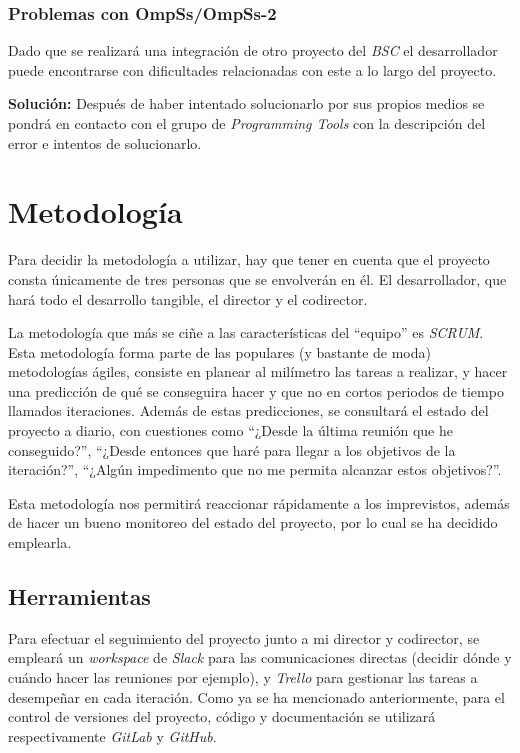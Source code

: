 \subsubsection{Problemas con OmpSs/OmpSs-2}

Dado que se realizará una integración de otro proyecto del \textit{BSC} el desarrollador puede encontrarse con dificultades relacionadas con este a lo largo del proyecto.
\par\medskip

\textbf{Solución:} Después de haber intentado solucionarlo por sus propios medios se pondrá en contacto con el grupo de \textit{Programming Tools} con la descripción del error e intentos de solucionarlo.

\section{Metodología}

Para decidir la metodología a utilizar, hay que tener en cuenta que el proyecto consta únicamente de tres personas que se envolverán en él. El desarrollador, que hará todo el desarrollo tangible, el director y el codirector. 
\par\bigskip

La metodología que más se ciñe a las características del ``equipo'' es \textit{SCRUM}. Esta metodología forma parte de las populares (y bastante de moda) metodologías ágiles, consiste en planear al milímetro las tareas a realizar, y hacer una predicción de qué se conseguira hacer y que no en cortos periodos de tiempo llamados iteraciones. Además de estas predicciones, se consultará el estado del proyecto a diario, con cuestiones como ``¿Desde la última reunión que he conseguido?'', ``¿Desde entonces que haré para llegar a los objetivos de la iteración?'', ``¿Algún impedimento que no me permita alcanzar estos objetivos?''.
\par\bigskip

Esta metodología nos permitirá reaccionar rápidamente a los imprevistos, además de hacer un bueno monitoreo del estado del proyecto, por lo cual se ha decidido emplearla.

\subsection{Herramientas}

Para efectuar el seguimiento del proyecto junto a mi director y codirector, se empleará un \textit{workspace} de \textit{Slack} para las comunicaciones directas (decidir dónde y cuándo hacer las reuniones por ejemplo), y \textit{Trello} para gestionar las tareas a desempeñar en cada iteración. Como ya se ha mencionado anteriormente, para el control de versiones del proyecto, código y documentación se utilizará respectivamente \textit{GitLab} y \textit{GitHub}.
